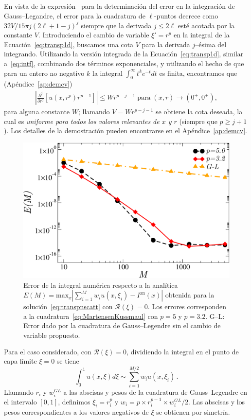 En vista de la expresión~\cite[p. 77]{Trefethen2008} 
para la determinación del error en la integración 
de Gauss--Legandre, el error para la cuadratura de $\ell$-puntos 
decrece como $32V/15\pi j (2\ell+1-j)^j$ siempre que la derivada 
$j \leq 2\ell$ esté acotada por la constante $V$. 
Introduciendo el cambio de variable  $\xi'=r^p$ en la integral 
de la Ecuación~\eqref{eq:transp1d}, buscamos una cota $V$ 
para la derivada $j$--ésima del integrando. 
Utilizando la versión integrada de la Ecuación~\eqref{eq:transp1d}, 
similar a~\eqref{eq:intf}, combinando dos términos exponenciales, 
y utilizando el hecho de que para un entero no negativo $k$ 
la integral $\int_0^\infty t^k e^{-t} dt$ es finita, 
encontramos que (Apéndice~\ref{ap:demcv})
\begin{equation}
\begin{split}
\left | \frac{\partial^j }{\partial r^j}\left[ u(x,r^p) r^{p-1}\right]
\right|\leq W r^{p-j-1}\; \text{para}  \; (x,r) \to (0^+,0^+),
\end{split}
\label{eq:boundedderblayer}
\end{equation}
para alguna constante $W$; llamando $V = W r^{p-j-1}$  
se obtiene la cota deseada, la cual es {\em uniforme 
para todos los valores relevantes de $x$ y $r$ } (siempre que 
$p \ge j+1$). Los 
detalles de la demostración pueden encontrarse en el Apéndice~\ref{ap:demcv}.
\begin{figure}[H]
\centering
  \includegraphics[width=0.5\linewidth]{figuras/quads.pdf}
  \caption{Error de la integral numérica respecto a la 
  analítica $E(M)=\text{max}_x |\sum_{i=1}^M w_i u(x,\xi_i)-I^{\text{an}}(x)|$
  obtenida para la solución~\eqref{eq:transpnscatt} con $\mathcal{R}(\xi)=0$. 
  Los errores corresponden a la cuadratura~\eqref{eq:MartensenKussmaul} 
  con $p=5$ y $p=3.2$. G--L: 
  Error dado por la cuadratura de Gauss--Legendre sin el cambio de variable propuesto.}
 \label{fig:intconvs}
\end{figure}
Para el caso considerado, con $\mathcal{R}(\xi)=0$, 
dividiendo la integral en el punto de capa límite $\xi=0$ se tiene 
\begin{equation}
\int_{0}^{1} u(x,\xi) d\xi \sim \sum_{i=1}^{M/2} w_i u(x,\xi_i) \, .
\label{eq:MartensenKussmaul}
\end{equation}
Llamando $r_i$ y $w_i^{GL}$ a las abscisas y pesos de la 
cuadratura de Gauss--Legendre en el intervalo $[0,1]$, 
definimos $\xi_i=r_i^p$ y $w_i= p \times r_i^{p-1} \times w_i^{GL}/2$. 
Las abscisas y los pesos correspondientes a los valores negativos 
de $\xi$ se obtienen por simetría. 


